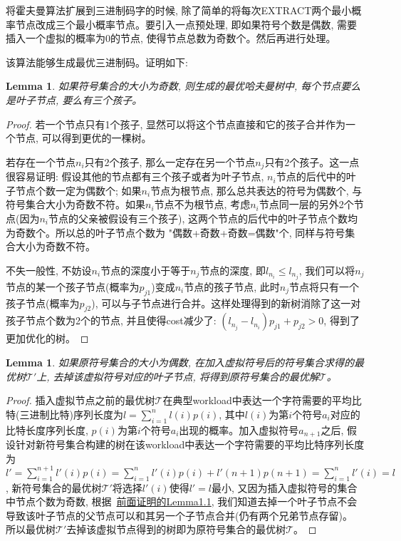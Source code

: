 \documentclass[paper=a4, fontsize=11pt]{scrartcl} %
\numberwithin{equation}{section} %
\numberwithin{figure}{section} %
\numberwithin{table}{section} %
\newtheorem{lemma}[theorem]{Lemma}
\begin{document}
将霍夫曼算法扩展到三进制码字的时候, 除了简单的将每次EXTRACT两个最小概率节点改成三个最小概率节点。要引入一点预处理, 即如果符号个数是偶数, 需要插入一个虚拟的概率为0的节点, 使得节点总数为奇数个。然后再进行处理。

该算法能够生成最优三进制码。证明如下:
\begin{lemma}
  \label{lemma:1}
  如果符号集合的大小为奇数, 则生成的最优哈夫曼树中, 每个节点要么是叶子节点, 要么有三个孩子。
\end{lemma}
\begin{proof}
  若一个节点只有1个孩子, 显然可以将这个节点直接和它的孩子合并作为一个节点, 可以得到更优的一棵树。

  若存在一个节点$n_i$只有2个孩子, 那么一定存在另一个节点$n_j$只有2个孩子。这一点很容易证明: 假设其他的节点都有三个孩子或者为叶子节点, $n_i$节点的后代中的叶子节点个数一定为偶数个; 如果$n_i$节点为根节点, 那么总共表达的符号为偶数个, 与符号集合大小为奇数不符。如果$n_i$节点不为根节点, 考虑$n_i$节点同一层的另外2个节点(因为$n_i$节点的父亲被假设有三个孩子), 这两个节点的后代中的叶子节点个数均为奇数个。所以总的叶子节点个数为 "偶数+奇数+奇数=偶数"个, 同样与符号集合大小为奇数不符。

  不失一般性, 不妨设$n_i$节点的深度小于等于$n_j$节点的深度, 即$l_{n_i} \leq l_{n_j}$, 我们可以将$n_j$节点的某一个孩子节点(概率为$p_{j1}$)变成$n_i$节点的孩子节点, 此时$n_j$节点将只有一个孩子节点(概率为$p_{j2}$), 可以与子节点进行合并。这样处理得到的新树消除了这一对孩子节点个数为2个的节点, 并且使得cost减少了: $(l_{n_j} - l_{n_i})p_{j1} + p_{j2} > 0$, 得到了更加优化的树。
\end{proof}

\begin{lemma}
  如果原符号集合的大小为偶数, 在加入虚拟符号后的符号集合求得的最优树$\mathscr{T'}$上, 去掉该虚拟符号对应的叶子节点, 将得到原符号集合的最优解$\mathscr{T}$。
\end{lemma}
\begin{proof}
  插入虚拟节点之前的最优树$\mathscr{T}$在典型workload中表达一个字符需要的平均比特(三进制比特)序列长度为$l = \sum_{i=1}^{n}{l(i)p(i)}$, 其中$l(i)$为第$i$个符号$a_i$对应的比特长度序列长度, $p(i)$为第$i$个符号$a_i$出现的概率。加入虚拟符号$a_{n+1}$之后, 假设针对新符号集合构建的树在该workload中表达一个字符需要的平均比特序列长度为$l' = \sum_{i=1}^{n+1}{l'(i)p(i)} = \sum_{i=1}^{n}{l'(i)p(i)} + l'(n+1)p(n+1) = \sum_{i=1}^{n}{l'(i)} = l$, 新符号集合的最优树$\mathscr{T'}$将选择$l'(i)$使得$l'=l$最小, 又因为插入虚拟符号的集合中节点个数为奇数, 根据~\hyperref[lemma:1]{前面证明的Lemma1.1}, 我们知道去掉一个叶子节点不会导致该叶子节点的父节点可以和其另一个子节点合并(仍有两个兄弟节点存留)。 所以最优树$\mathscr{T'}$去掉该虚拟节点得到的树即为原符号集合的最优树$\mathscr{T}$。
\end{proof}
\end{document}
